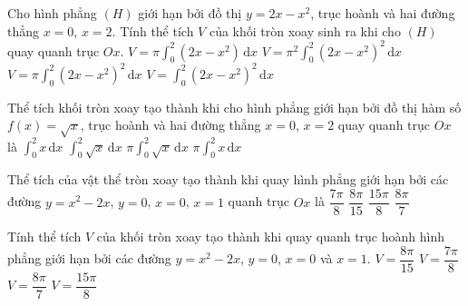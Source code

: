 \begin{ex}%
	Cho hình phẳng $(H)$ giới hạn bởi đồ thị $y=2x-x^2$, trục hoành và hai đường thẳng $x=0$, $x=2$. Tính thể tích $V$ của khối tròn xoay sinh ra  khi cho $(H)$ quay quanh trục $Ox$.
	 \choice
		{$V=\pi  \displaystyle\int_0^2\left(2x-x^2\right)\mathrm{\,d}x$}
		{$V=\pi^2\displaystyle\int_0^2\left(2x-x^2\right)^2\mathrm{\,d}x$} 
		 {\True $V=\pi \displaystyle\int_0^2\left(2x-x^2\right)^2\mathrm{\,d}x$}
		{$V=\displaystyle\int_0^2\left(2x-x^2\right)^2 \mathrm{\,d}x$} 
\end{ex}

\begin{ex}%
	Thể tích khối tròn xoay tạo thành  khi cho hình phẳng giới hạn bởi đồ thị hàm số $f(x)=\sqrt{x}$, trục hoành và hai đường thẳng $x=0$, $x=2$ quay quanh trục $O x$ là
	 \choice
		{$\displaystyle\int_{0}^{2} x  \mathrm{\,d}x$}
		 {$\displaystyle\int_{0}^{2} \sqrt{x} \mathrm{\,d} x$}
		 {$\pi \displaystyle\int_{0}^{2} \sqrt{x} \mathrm{\,d} x$}
		{\True $\pi  \displaystyle\int_{0}^{2} x \mathrm{\,d} x$}
\end{ex}

\begin{ex}%
	Thể tích của vật thể  tròn xoay tạo thành khi quay hình phẳng giới hạn bởi các đường $y=x^2-2x$, $y=0$, $x=0$, $x=1$ quanh trục $Ox$ là
	 \choice
		 {$\dfrac{7\pi}{8}$}
		 {$\dfrac{8\pi}{15}$}
		{$\dfrac{15\pi}{8}$} 
		 {$\dfrac{8\pi}{7}$}
\end{ex}

\begin{ex}%
	Tính thể tích $V$ của khối tròn xoay tạo thành khi quay quanh trục hoành hình phẳng giới hạn bởi các đường $y=x^2-2x$, $y=0$, $x=0$ và $x=1$. 
	\choice 
		{\True $V=\dfrac{8\pi}{15}$} 
		 {$V=\dfrac{7\pi}{8}$}
		 {$V=\dfrac{8\pi}{7}$}
		{$V=\dfrac{15\pi}{8}$} 
\end{ex}

